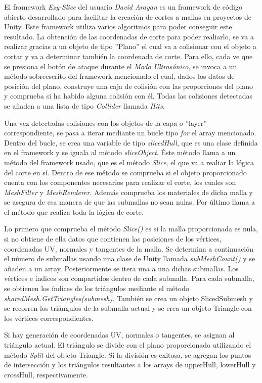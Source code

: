 El framework \textit{Ezy-Slice} del usuario \textit{David Arayan} es un framework de código abierto desarrollado para facilitar la creación de cortes a mallas en proyectos de Unity. Este framework utiliza varios algoritmos para poder conseguir este resultado. La obtención de las coordenadas de corte para poder realiarlo, se va a realizar gracias a un objeto de tipo ''Plano'' el cual va a colisionar con el objeto a cortar y va a determinar también la coordenada de corte. Para ello, cada ve que se presiona el botón de ataque durante el \textit{Modo Ultrasónico}, se invoca a un método sobreescrito del framework mencionado el cual, dados los datos de posición del plano, construye una caja de colisión con las proporciones del plano y comprueba si ha habido alguna colisión con él. Todas las colisiones detectadas se añaden a una lista de tipo \textit{Collider} llamada \textit{Hits}.

Una vez detectadas colisiones con los objetos de la capa o ''layer'' correspondiente, se pasa a iterar mediante un bucle tipo \textit{for} el array mencionado. Dentro del bucle, se crea una variable de tipo \textit{slicedHull}, que es una clase definida en el framework y se iguala al método \textit{sliceObject}. Éste método llama a un método del framework usado, que es el método \textit{Slice}, el que va a realiar la lógica del corte en sí. Dentro de ese método se comprueba si el objeto proporcionado cuenta con los componentes necesarios para realizar el corte, los cuales son \textit{MeshFilter} y \textit{MeshRenderer}. Además comprueba los materiales de dicha malla y se asegura de esa manera de que las submallas no sean nulas. Por último llama a el método que realiza toda la lógica de corte.

Lo primero que comprueba el método \textit{Slice()} es si la malla proporcionada es nula, si no obtiene de ella datos que contienen las posiciones de los vértices, coordenadas UV, normales y tangentes de la malla. Se determina a continuación el número  de submallas usando una clase de Unity llamada \textit{subMeshCount()} y se añaden a un array. Posteriormente se itera una a una dichas submallas. Los vértices e índices son compartidos dentro de cada submalla. Para cada submalla, se obtienen los índices de los triángulos mediante el método \textit{sharedMesh.GetTriangles(submesh)}. También se crea un objeto SlicedSubmesh y se recorren los triángulos de la submalla actual y se crea un objeto Triangle con los vértices correspondientes.

Si hay generación de coordenadas UV, normales o tangentes, se asignan al triángulo actual. El triángulo se divide con el plano proporcionado utilizando el método \textit{Split} del objeto Triangle. Si la división es exitosa, se agregan los puntos de intersección y los triángulos resultantes a los arrays de upperHull, lowerHull y crossHull, respectivamente.

